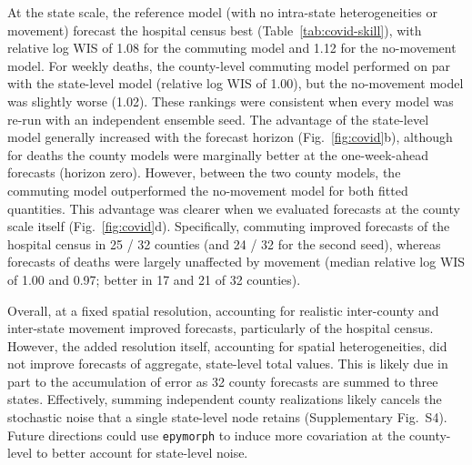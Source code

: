 At the state scale, the reference model (with no intra-state heterogeneities or movement) forecast the hospital census best (Table~\ref{tab:covid-skill}), with relative log WIS of 1.08 for the commuting model and 1.12 for the no-movement model. 
For weekly deaths, the county-level commuting model performed on par with the state-level model (relative log WIS of 1.00), but the no-movement model was slightly worse (1.02). 
These rankings were consistent when every model was re-run with an independent ensemble seed. 
The advantage of the state-level model generally increased with the forecast horizon (Fig.~\ref{fig:covid}b), although for deaths the county models were marginally better at the one-week-ahead forecasts (horizon zero). 
However, between the two county models, the commuting model outperformed the no-movement model for both fitted quantities. 
This advantage was clearer when we evaluated forecasts at the county scale itself (Fig.~\ref{fig:covid}d). 
Specifically, commuting improved forecasts of the hospital census in 25 / 32 counties (and 24 / 32 for the second seed), whereas forecasts of deaths were largely unaffected by movement (median relative log WIS of 1.00 and 0.97; better in 17 and 21 of 32 counties).

Overall, at a fixed spatial resolution, accounting for realistic inter-county and inter-state movement improved forecasts, particularly of the hospital census.
However, the added resolution itself, accounting for spatial heterogeneities, did not improve forecasts of aggregate, state-level total values. 
This is likely due in part to the accumulation of error as 32 county forecasts are summed to three states. 
Effectively, summing independent county realizations likely cancels the stochastic noise that a single state-level node retains (Supplementary Fig.~S4).
Future directions could use \texttt{epymorph} to induce more covariation at the county-level to better account for state-level noise. 
